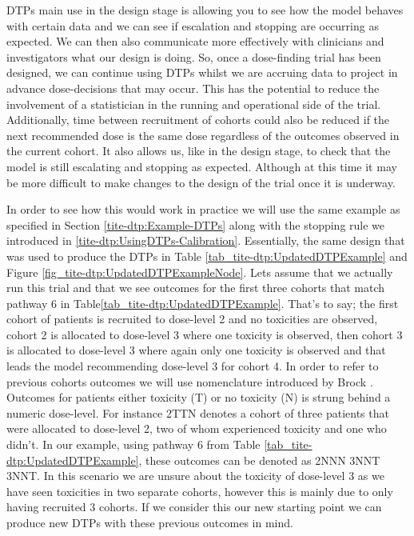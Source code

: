 DTPs main use in the design stage is allowing you to see how the model behaves with certain data and we can see if escalation and stopping are occurring as expected. We can then also communicate more effectively with clinicians and investigators what our design is doing. So, once a dose-finding trial has been designed, we can continue using DTPs whilst we are accruing data to project in advance dose-decisions that may occur. This has the potential to reduce the involvement of a statistician in the running and operational side of the trial. Additionally, time between recruitment of cohorts could also be reduced if the next recommended dose is the same dose regardless of the outcomes observed in the current cohort. It also allows us, like in the design stage, to check that the model is still escalating and stopping as expected. Although at this time it may be more difficult to make changes to the design of the trial once it is underway. 

In order to see how this would work in practice we will use the same example as specified in Section \ref{tite-dtp:Example-DTPs} along with the stopping rule we introduced in \ref{tite-dtp:UsingDTPs-Calibration}. Essentially, the same design that was used to produce the DTPs in Table \ref{tab_tite-dtp:UpdatedDTPExample} and Figure \ref{fig_tite-dtp:UpdatedDTPExampleNode}. Lets assume that we actually run this trial and that we see outcomes for the first three cohorts that match pathway 6 in Table\ref{tab_tite-dtp:UpdatedDTPExample}. That's to say; the first cohort of patients is recruited to dose-level 2 and no toxicities are observed, cohort 2 is allocated to dose-level 3 where one toxicity is observed, then cohort 3 is allocated to dose-level 3 where again only one toxicity is observed and that leads the  model recommending dose-level 3 for cohort 4. In order to refer to previous cohorts outcomes we will use nomenclature introduced by Brock \cite{brockImplementingEffToxDosefinding2017}. Outcomes for patients either toxicity (T) or no toxicity (N) is strung behind a numeric dose-level. For instance 2TTN denotes a cohort of three patients that were allocated to dose-level 2, two of whom experienced toxicity and one who didn't. In our example, using pathway 6 from Table \ref{tab_tite-dtp:UpdatedDTPExample}, these outcomes can be denoted as 2NNN 3NNT 3NNT. In this scenario we are unsure about the toxicity of dose-level 3 as we have seen toxicities in two separate cohorts, however this is mainly due to only having recruited 3 cohorts. If we consider this our new starting point we can produce new DTPs with these previous outcomes in mind. 

